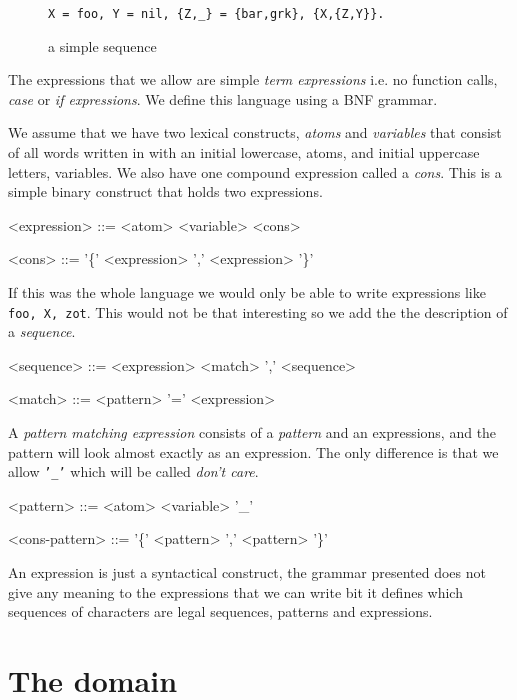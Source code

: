\documentclass[a4paper,11pt]{article}
\begin{document}
\begin{figure}[ht]
\center
{\tt X = foo, Y = nil, \{Z,_\} = \{bar,grk\}, \{X,\{Z,Y\}\}.}
\caption{a simple sequence}
\label{fig:seq1}
\end{figure}

The expressions that we allow are simple {\em term expressions}
i.e. no function calls, {\em case} or {\em if expressions}. We define
this language using a BNF grammar.

We assume that we have two lexical constructs, {\em atoms} and {\em
  variables} that consist of all words written in with an initial
lowercase, atoms, and initial uppercase letters, variables.  We also
have one compound expression called a {\em cons}. This is a simple
binary construct that holds two expressions.


\begin{grammar}
<expression> ::= <atom> \alt <variable> \alt <cons> 

<cons> ::= '\{' <expression> ',' <expression> '\}'
\end{grammar}



If this was the whole language we would only be able to write
expressions like {\tt {foo, {X, zot}}}. This would not be that
interesting so we add the the description of a {\em sequence}.

\begin{grammar}
<sequence> ::= <expression> \alt <match> ',' <sequence>

<match> ::= <pattern> '=' <expression> 
\end{grammar}


A {\em pattern matching expression} consists of a {\em pattern} and an
expressions, and the pattern will look almost exactly as an
expression. The only difference is that we allow {\tt '_'} which will
be called {\em don't care}.

\begin{grammar}
<pattern> ::= <atom>
\alt <variable>
\alt '_'  

<cons-pattern> ::= '\{' <pattern> ',' <pattern> '\}'
\end{grammar}

An expression is just a syntactical construct, the grammar presented
does not give any meaning to the expressions that we can write bit it
defines which sequences of characters are legal sequences, patterns
and expressions.

\section{The domain}
\end{document}

